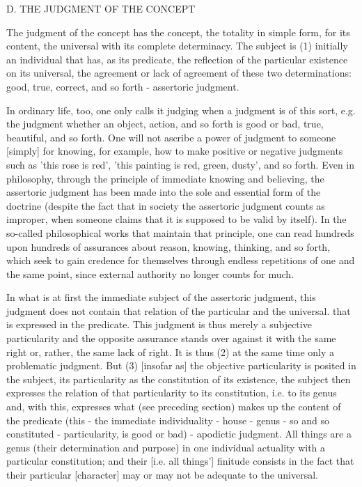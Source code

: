 D. THE JUDGMENT OF THE CONCEPT

The judgment of the concept has the concept, the totality in simple form,
for its content, the universal with its complete determinacy.
The subject is (1) initially an individual that has, as its predicate,
the reflection of the particular existence on its universal,
the agreement or lack of agreement of these two determinations:
good, true, correct, and so forth - assertoric judgment.

    In ordinary life, too, one only calls it judging when a judgment is of
    this sort, e.g. the judgment whether an object, action, and so forth is
    good or bad, true, beautiful, and so forth. One will not ascribe a
    power of judgment to someone [simply] for knowing, for example,
    how to make positive or negative judgments such as 'this rose is red',
    'this painting is red, green, dusty', and so forth.
    Even in philosophy, through the principle of immediate knowing
    and believing, the assertoric judgment has been made into the sole
    and essential form of the doctrine (despite the fact that in society the
    assertoric judgment counts as improper, when someone claims that
    it is supposed to be valid by itself). In the so-called philosophical
    works that maintain that principle, one can read hundreds upon
    hundreds of assurances about reason, knowing, thinking,
    and so forth, which seek to gain credence for themselves through
    endless repetitions of one and the same point, since external
    authority no longer counts for much.

In what is at first the immediate subject of the assertoric judgment,
this judgment does not contain that relation of the particular and the universal.
that is expressed in the predicate.
This judgment is thus merely a subjective particularity and
the opposite assurance stands over against it with the
same right or, rather, the same lack of right.
It is thus (2) at the same time only a problematic judgment.
But (3) [insofar as] the objective particularity is posited in the subject,
its particularity as the constitution of its existence,
the subject then expresses the relation of that particularity to its constitution,
i.e. to its genus and, with this, expresses what (see preceding section)
makes up the content of the predicate
(this - the immediate individuality - house - genus - so and so constituted - particularity,
is good or bad) - apodictic judgment.
All things are a genus (their determination and purpose)
in one individual actuality with a particular constitution;
and their [i.e. all things'] finitude consists in the fact that
their particular [character] may or may not be adequate to the universal.

